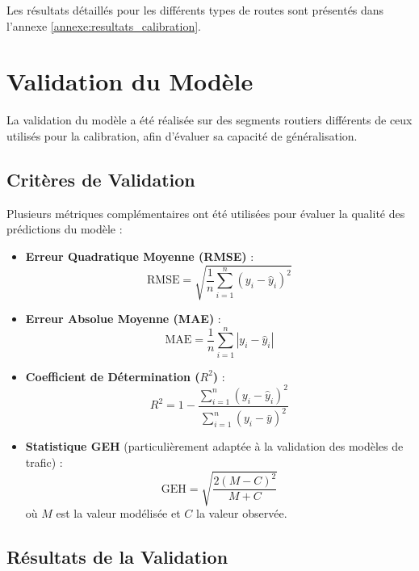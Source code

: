 Les résultats détaillés pour les différents types de routes sont présentés dans l'annexe \ref{annexe:resultats_calibration}.

\section{Validation du Modèle}
\label{sec:validation}

La validation du modèle a été réalisée sur des segments routiers différents de ceux utilisés pour la calibration, afin d'évaluer sa capacité de généralisation.

\subsection{Critères de Validation}
\label{subsec:criteres_validation}

Plusieurs métriques complémentaires ont été utilisées pour évaluer la qualité des prédictions du modèle :

\begin{itemize}
\item \textbf{Erreur Quadratique Moyenne (RMSE)} :
\begin{equation}
\text{RMSE} = \sqrt{\frac{1}{n}\sum_{i=1}^n (y_i - \hat{y}_i)^2}
\end{equation}

\item \textbf{Erreur Absolue Moyenne (MAE)} :
\begin{equation}
\text{MAE} = \frac{1}{n}\sum_{i=1}^n |y_i - \hat{y}_i|
\end{equation}

\item \textbf{Coefficient de Détermination ($R^2$)} :
\begin{equation}
R^2 = 1 - \frac{\sum_{i=1}^n (y_i - \hat{y}_i)^2}{\sum_{i=1}^n (y_i - \bar{y})^2}
\end{equation}

\item \textbf{Statistique GEH} (particulièrement adaptée à la validation des modèles de trafic) :
\begin{equation}
\text{GEH} = \sqrt{\frac{2(M-C)^2}{M+C}}
\end{equation}
où $M$ est la valeur modélisée et $C$ la valeur observée.
\end{itemize}

\subsection{Résultats de la Validation}
\label{subsec:resultats_validation}

